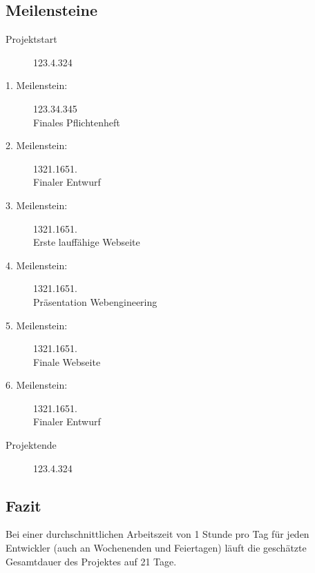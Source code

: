 \newpage
\subsection{Meilensteine}
\begin{description}
	\item[Projektstart] 123.4.324
	\item[1. Meilenstein:] 123.34.345\\
	Finales Pflichtenheft
	\item[2. Meilenstein:] 1321.1651.\\
	Finaler Entwurf
	\item[3. Meilenstein:] 1321.1651.\\
	Erste lauffähige Webseite
	\item[4. Meilenstein:] 1321.1651.\\
	Präsentation Webengineering
	\item[5. Meilenstein:] 1321.1651.\\
	Finale Webseite
	\item[6. Meilenstein:] 1321.1651.\\
	Finaler Entwurf
	\item[Projektende] 123.4.324
\end{description}

\subsection{Fazit}
Bei einer durchschnittlichen Arbeitszeit von 1 Stunde pro Tag für jeden Entwickler (auch an Wochenenden und Feiertagen) läuft die geschätzte Gesamtdauer des Projektes auf 21 Tage.